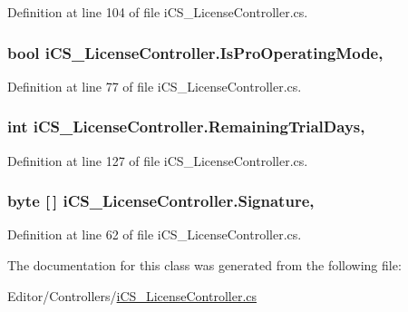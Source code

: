 Definition at line 104 of file i\+C\+S\+\_\+\+License\+Controller.\+cs.

\hypertarget{classi_c_s___license_controller_a789d1c6f639e1fbf58f696446c402c70}{
\subsubsection[{Is\+Pro\+Operating\+Mode}]{\setlength{\rightskip}{0pt plus 5cm}bool i\+C\+S\+\_\+\+License\+Controller.\+Is\+Pro\+Operating\+Mode\hspace{0.3cm}{\ttfamily [static]}, {\ttfamily [get]}}}\label{classi_c_s___license_controller_a789d1c6f639e1fbf58f696446c402c70}


Definition at line 77 of file i\+C\+S\+\_\+\+License\+Controller.\+cs.

\hypertarget{classi_c_s___license_controller_a55ed2f505c86334b4be47d81aca53202}{
\subsubsection[{Remaining\+Trial\+Days}]{\setlength{\rightskip}{0pt plus 5cm}int i\+C\+S\+\_\+\+License\+Controller.\+Remaining\+Trial\+Days\hspace{0.3cm}{\ttfamily [static]}, {\ttfamily [get]}}}\label{classi_c_s___license_controller_a55ed2f505c86334b4be47d81aca53202}


Definition at line 127 of file i\+C\+S\+\_\+\+License\+Controller.\+cs.

\hypertarget{classi_c_s___license_controller_a3cea8d28f16e40b0956ea42d865d6621}{
\subsubsection[{Signature}]{\setlength{\rightskip}{0pt plus 5cm}byte \mbox{[}$\,$\mbox{]} i\+C\+S\+\_\+\+License\+Controller.\+Signature\hspace{0.3cm}{\ttfamily [static]}, {\ttfamily [get]}}}\label{classi_c_s___license_controller_a3cea8d28f16e40b0956ea42d865d6621}


Definition at line 62 of file i\+C\+S\+\_\+\+License\+Controller.\+cs.



The documentation for this class was generated from the following file\+:\begin{DoxyCompactItemize}
\item 
Editor/\+Controllers/\hyperlink{i_c_s___license_controller_8cs}{i\+C\+S\+\_\+\+License\+Controller.\+cs}\end{DoxyCompactItemize}
